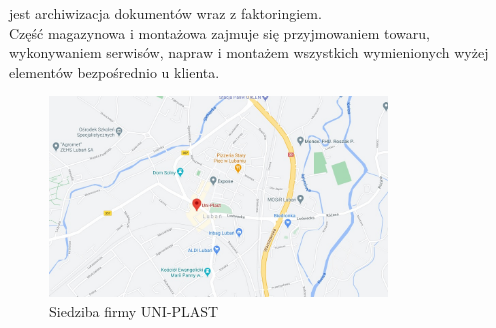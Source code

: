 \documentclass[12pt,a4paper]{article}
\begin{document}
			jest archiwizacja dokumentów wraz z faktoringiem.\\
		\indent Część magazynowa i montażowa zajmuje się przyjmowaniem towaru, wykonywaniem serwisów, napraw i montażem wszystkich wymienionych wyżej elementów bezpośrednio
			u klienta.
		\begin{figure}[H]
			\centering
			\includegraphics[width=0.8\textwidth]{img/siedziba.jpg}
			\caption{Siedziba firmy UNI-PLAST}
			\label{fig:lokalizacja}
		\end{figure}

	\newpage

\end{document}
